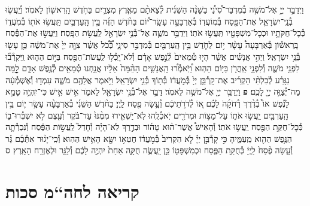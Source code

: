 \documentclass[twoside, openany, parskip=half, 11pt]{book}
\begin{document}
\begin{footnotesize}
\begin{multicols}{2}
\\
\\
וַיְדַבֵּ֣ר יְיָ֣ אֶל־מֹשֶׁ֣ה בְ֯מִדְבַּר־סִ֠ינַ֠י בַּשָּׁנָ֨ה הַשֵּׁנִ֜ית לְ֯צֵאתָ֨ם מֵאֶ֧רֶץ מִצְרַ֛יִם בַּחֹ֥דֶשׁ הָֽרִאשׁ֖וֹן לֵאמֹֽר׃ וְ֯יַֽעֲשׂ֧וּ בְ֯נֵֽי־יִשְׂרָאֵ֛ל אֶת־הַפָּ֖סַח בְּ֯מֽוֹעֲדֽוֹ׃ בְּ֯אַרְבָּעָ֣ה עָשָֽׂר־י֠וֹם בַּחֹ֨דֶשׁ הַזֶּ֜ה בֵּ֧ין הָֽעַרְבַּ֛יִם תַּֽעֲשׂ֥וּ אֹת֖וֹ בְּ֯מֹֽעֲד֑וֹ כְּ֯כׇל־חֻקֹּתָ֥יו וּכְכׇל־מִשְׁפָּטָ֖יו תַּֽעֲשׂ֥וּ אֹתֽוֹ׃ וַיְדַבֵּ֥ר מֹשֶׁ֛ה אֶל־בְּ֯נֵ֥י יִשְׂרָאֵ֖ל לַֽעֲשׂ֥ת הַפָּֽסַח׃ וַיַּֽעֲשׂ֣וּ אֶת־הַפֶּ֡סַח בָּֽרִאשׁ֡וֹן בְּ֯אַרְבָּעָה֩ עָשָׂ֨ר י֥וֹם לַחֹ֛דֶשׁ בֵּ֥ין הָֽעַרְבַּ֖יִם בְּ֯מִדְבַּ֣ר סִינָ֑י כְּ֠֯כֹ֠ל אֲשֶׁ֨ר צִוָּ֤ה יְיָ֙ אֶת־מֹשֶׁ֔ה כֵּ֥ן עָשׂ֖וּ בְּ֯נֵ֥י יִשְׂרָאֵֽל׃
וַיְהִ֣י אֲנָשִׁ֗ים אֲשֶׁ֨ר הָי֤וּ טְ֯מֵאִים֙ לְ֯נֶ֣פֶשׁ אָדָ֔ם וְ֯לֹא־יָֽכְ֯ל֥וּ לַֽעֲשֹׂת־הַפֶּ֖סַח בַּיּ֣וֹם הַה֑וּא וַֽיִּקְרְ֯ב֞וּ לִפְנֵ֥י מֹשֶׁ֛ה וְ֯לִפְנֵ֥י אַֽהֲרֹ֖ן בַּיּ֥וֹם הַהֽוּא׃ וַ֠יֹּֽאמְ֯ר֠וּ הָֽאֲנָשִׁ֤ים הָהֵ֨מָּה֙ אֵלָ֔יו אֲנַ֥חְנוּ טְ֯מֵאִ֖ים לְ֯נֶ֣פֶשׁ אָדָ֑ם לׇׇׇׇׇׇ֣מָּה נִגָּרַ֗ע לְ֯בִלְתִּ֨י הַקְרִ֜יב אֶת־קָרְ֯בַּ֤ן יְיָ֙ בְּ֯מֹ֣עֲד֔וֹ בְּ֯ת֖וֹךְ בְּ֯נֵ֥י יִשְׂרָאֵֽל׃ וַיֹּ֥אמֶר אֲלֵהֶ֖ם מֹשֶׁ֑ה עִמְד֣וּ וְ֯אֶשְׁמְ֯עָ֔ה מַה־יְּ֯צַוֶּ֥ה יְיָ֖ לָכֶֽם׃ \textbf{פ}
וַיְדַבֵּ֥ר יְיָ֖ אֶל־מֹשֶׁ֥ה לֵּאמֹֽר׃ דַּבֵּ֛ר אֶל־בְּ֯נֵ֥י יִשְׂרָאֵ֖ל לֵאמֹ֑ר אִ֣ישׁ אִ֣ישׁ כִּי־יִֽהְיֶ֥ה טָמֵ֣א לָנֶ֡פֶשׁ אוֹ֩ בְ֯דֶ֨רֶךְ רְ֯חֹקָ֜הֹ לָכֶ֗ם א֚וֹ לְ֯דֹרֹ֣תֵיכֶ֔ם וְ֯עָ֥שָׂה פֶ֖סַח לַֽיְיָ׃ בַּחֹ֨דֶשׁ הַשֵּׁנִ֜י בְּ֯אַרְבָּעָ֨ה עָשָׂ֥ר י֛וֹם בֵּ֥ין הָֽעַרְבַּ֖יִם יַֽעֲשׂ֣וּ אֹת֑וֹ עַל־מַצּ֥וֹת וּמְרֹרִ֖ים יֹֽאכְ֯לֻֽהוּ׃ לֹֽא־יַשְׁאִ֤ירוּ מִמֶּ֨נּוּ֙ עַד־בֹּ֔קֶר וְ֯עֶ֖צֶם לֹ֣א יִשְׁבְּ֯רוּ־ב֑וֹ כְּ֯כׇל־חֻקַּ֥ת הַפֶּ֖סַח יַֽעֲשׂ֥וּ אֹתֽוֹ׃ וְ֯הָאִישׁ֩ אֲשֶׁר־ה֨וּא טָה֜וֹר וּבְדֶ֣רֶךְ לֹֽא־הָיָ֗ה וְ֯חָדַל֙ לַֽעֲשׂ֣וֹת הַפֶּ֔סַח וְ֯נִכְרְ֯תָ֛ה הַנֶּ֥פֶשׁ הַהִ֖וא מֵֽעַמֶּ֑יהָ כִּ֣י קָרְ֯בַּ֣ן יְיָ֗ לֹ֤א הִקְרִיב֙ בְּ֯מֹ֣עֲד֔וֹ חֶטְא֥וֹ יִשָּׂ֖א הָאִ֥ישׁ הַהֽוּא׃ וְ֯כִֽי־יָג֨וּר אִתְּ֯כֶ֜ם גֵּ֗ר וְ֯עָ֤שָׂה פֶ֨סַח֙ לַֽיְיָ֔ כְּ֯חֻקַּ֥ת הַפֶּ֛סַח וּכְמִשְׁפָּט֖וֹ כֵּ֣ן יַֽעֲשֶׂ֑ה חֻקָּ֤ה אַחַת֙ יִהְיֶ֣ה לָכֶ֔ם וְ֯לַגֵּ֖ר וּלְאֶזְרַ֥ח הָאָֽרֶץ׃ ס

\end{multicols}

\clearpage

\section[חה“מ סכות]{קריאה לחה“מ סכות}


\end{footnotesize}
\end{document}
